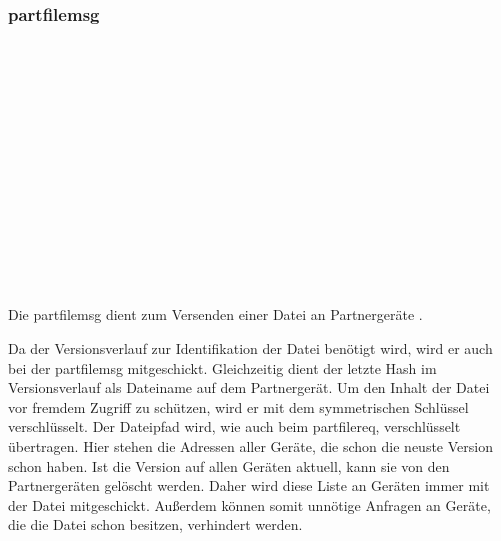 \subsubsection{\gls{partfilemsg}}
\messagestart
	\begin{rightwordgroup}{\isprotomsgtype}
	\end{rightwordgroup}\\
	
	\begin{rightwordgroup}{\isprotomsgdata}
		 \\
		\skippedwords \\
		 \\
		 \\
		\skippedwords \\
		 \\
		 \\
		\skippedwords \\
		 \\
		 \\
		\skippedwords \\
	\end{rightwordgroup}
Die \gls{partfilemsg} dient zum Versenden einer Datei an Partnergeräte  .
\begin{description}
	Da der Versionsverlauf zur Identifikation der Datei benötigt wird, wird er auch bei der \gls{partfilemsg} mitgeschickt. Gleichzeitig dient der letzte Hash im Versionsverlauf als Dateiname auf dem Partnergerät.
	Um den Inhalt der Datei vor fremdem Zugriff zu schützen, wird er mit dem symmetrischen Schlüssel  verschlüsselt. 
	Der Dateipfad wird, wie auch beim \gls{partfilereq}, verschlüsselt übertragen. 
	Hier stehen die Adressen aller Geräte, die schon die neuste Version schon haben. Ist die Version auf allen Geräten aktuell, kann sie von den Partnergeräten gelöscht werden. Daher wird diese Liste an Geräten immer mit der Datei mitgeschickt. Außerdem können somit unnötige Anfragen an Geräte, die die Datei schon besitzen, verhindert werden.
\end{description}

